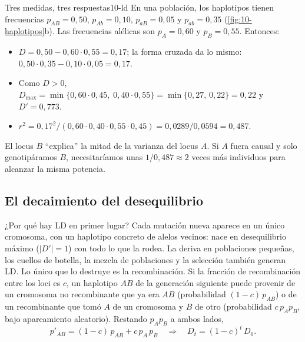 \begin{ejemplo}{Tres medidas, tres respuestas}{10-ld}
En una población, los haplotipos tienen frecuencias $p_{AB}=0{,}50$, $p_{Ab}=0{,}10$, $p_{aB}=0{,}05$ y $p_{ab}=0{,}35$ (\cref{fig:10-haplotipos}b). Las frecuencias alélicas son $p_A=0{,}60$ y $p_B=0{,}55$. Entonces:
\begin{itemize}
  \item $D=0{,}50-0{,}60\cdot0{,}55=0{,}17$; la forma cruzada da lo mismo: $0{,}50\cdot0{,}35-0{,}10\cdot0{,}05=0{,}17$.
  \item Como $D>0$, $D_{\max}=\min\{0{,}60\cdot0{,}45,\;0{,}40\cdot0{,}55\}=\min\{0{,}27,\,0{,}22\}=0{,}22$ y $D'=0{,}773$.
  \item $r^2=0{,}17^2/(0{,}60\cdot0{,}40\cdot0{,}55\cdot0{,}45)=0{,}0289/0{,}0594=0{,}487$.
\end{itemize}
El locus $B$ ``explica'' la mitad de la varianza del locus $A$. Si $A$ fuera causal y solo genotipáramos $B$, necesitaríamos unas $1/0{,}487\approx2$ veces más individuos para alcanzar la misma potencia.
\end{ejemplo}

\subsection{El decaimiento del desequilibrio}

¿Por qué hay LD en primer lugar? Cada mutación nueva aparece en un único cromosoma, con un haplotipo concreto de alelos vecinos: nace en desequilibrio máximo ($|D'|=1$) con todo lo que la rodea. La deriva en poblaciones pequeñas, los cuellos de botella, la mezcla de poblaciones y la selección también generan LD. Lo único que lo destruye es la recombinación. Si la fracción de recombinación entre los loci es $c$, un haplotipo $AB$ de la generación siguiente puede provenir de un cromosoma no recombinante que ya era $AB$ (probabilidad $(1-c)\,p_{AB}$) o de un recombinante que tomó $A$ de un cromosoma y $B$ de otro (probabilidad $c\,p_Ap_B$, bajo apareamiento aleatorio). Restando $p_Ap_B$ a ambos lados,
\begin{equation}\label{eq:10-decay}
p'_{AB} = (1-c)\,p_{AB} + c\,p_A\,p_B
\quad\Longrightarrow\quad
D_{t} = (1-c)^{t}\,D_0 .
\end{equation}

\begin{simbolos}
\end{simbolos}

